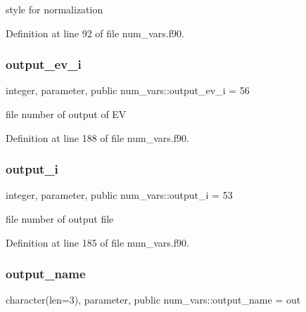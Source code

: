 style for normalization 



Definition at line 92 of file num\+\_\+vars.\+f90.

\mbox{\label{namespacenum__vars_a98774008e1bfbed335a89f813c7dcbde}} 
\subsubsection{\texorpdfstring{output\+\_\+ev\+\_\+i}{output\_ev\_i}}
{\footnotesize\ttfamily integer, parameter, public num\+\_\+vars\+::output\+\_\+ev\+\_\+i = 56}



file number of output of EV 



Definition at line 188 of file num\+\_\+vars.\+f90.

\mbox{\label{namespacenum__vars_aec5ffb30114a8af11226208844d12998}} 
\subsubsection{\texorpdfstring{output\+\_\+i}{output\_i}}
{\footnotesize\ttfamily integer, parameter, public num\+\_\+vars\+::output\+\_\+i = 53}



file number of output file 



Definition at line 185 of file num\+\_\+vars.\+f90.

\mbox{\label{namespacenum__vars_a0fbc4b8f8965e85d6cb1b1f7894ab698}} 
\subsubsection{\texorpdfstring{output\+\_\+name}{output\_name}}
{\footnotesize\ttfamily character(len=3), parameter, public num\+\_\+vars\+::output\+\_\+name = \textquotesingle{}out\textquotesingle{}}



